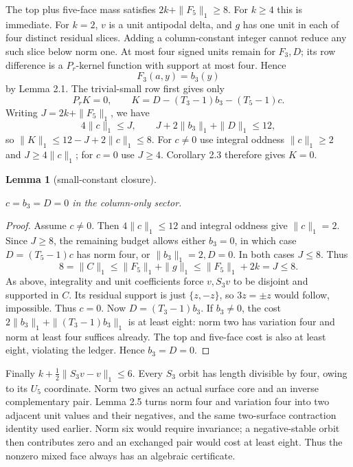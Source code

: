 \documentclass[11pt]{amsart}
\numberwithin{theorem}{section}
\newtheorem{lemma}[theorem]{Lemma}
\theoremstyle{remark}
\numberwithin{equation}{section}
\begin{document}
The top plus five-face mass satisfies \(2k+\|F_5\|_1\ge8\).
For \(k\ge4\) this is immediate. For \(k=2\), \(v\) is a unit
antipodal delta, and \(g\) has one unit in each of four distinct
residual slices. Adding a column-constant integer cannot reduce any such
slice below norm one. At most four signed units remain for \(F_3,D\);
its row difference is a \(P_r\)-kernel function with support at most
four. Hence
\[
F_3(a,y)=b_3(y)
\]
by Lemma 2.1. The trivial-small row first gives only
\[
P_rK=0,\qquad K=D-(T_3-1)b_3-(T_5-1)c.
\]
Writing \(J=2k+\|F_5\|_1\), we have
\[
4\|c\|_1\le J,\qquad J+2\|b_3\|_1+\|D\|_1\le12,
\]
so \(\|K\|_1\le12-J+2\|c\|_1\le8\). For \(c\ne0\) use
integral oddness \(\|c\|_1\ge2\) and \(J\ge4\|c\|_1\); for
\(c=0\) use \(J\ge4\). Corollary 2.3 therefore gives \(K=0\).

\begin{lemma}[small-constant closure]\label{lemma:8.4}

\(c=b_3=D=0\) in the column-only sector.

\end{lemma}
\begin{proof}

Assume \(c\ne0\). Then \(4\|c\|_1\le12\) and integral oddness give
\(\|c\|_1=2\). Since \(J\ge8\), the remaining budget allows either
\(b_3=0\), in which case \(D=(T_5-1)c\) has norm four, or
\(\|b_3\|_1=2,D=0\). In both cases \(J\le8\). Thus
\[
8=\|C\|_1\le\|F_5\|_1+\|g\|_1
\le\|F_5\|_1+2k=J\le8.
\]
As above, integrality and unit coefficients force \(v,S_3v\) to be
disjoint and supported in \(C\). Its residual support is just
\(\{z,-z\}\), so \(3z=\pm z\) would follow, impossible. Thus
\(c=0\). Now \(D=(T_3-1)b_3\). If \(b_3\ne0\), the cost
\(2\|b_3\|_1+\|(T_3-1)b_3\|_1\) is at least eight: norm two has
variation four and norm at least four suffices already. The top and
five-face cost is also at least eight, violating the ledger. Hence
\(b_3=D=0\).
\end{proof}

Finally \(k+\tfrac12\|S_3v-v\|_1\le6\). Every \(S_3\) orbit has
length divisible by four, owing to its \(U_5\) coordinate. Norm two
gives an actual surface core and an inverse complementary pair.
Lemma 2.5 turns norm four and variation four into two adjacent unit
values and their negatives, and the same two-surface contraction identity
used earlier. Norm six would require invariance; a negative-stable orbit
then contributes zero and an exchanged pair would cost at least eight.
Thus the nonzero mixed face always has an algebraic certificate.
\end{document}
